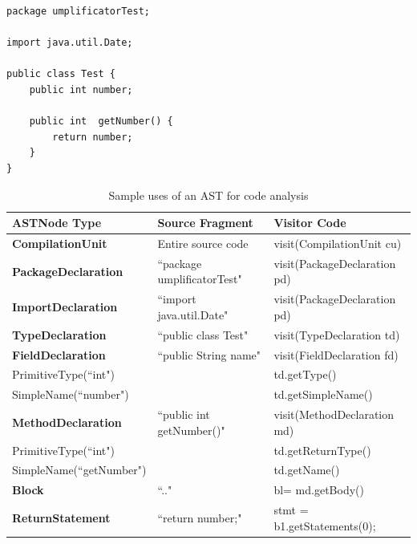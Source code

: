 \begin{lstlisting}[style=java, caption=Test.java, label=lst:astjava]
package umplificatorTest;

import java.util.Date;

public class Test {
	public int number;
	
	public int  getNumber() {
		return number;
	}
}
\end{lstlisting}

\newcommand*{\MyIndent}{\hspace*{0.4cm}}%
\begin{table}[h]
\caption{Sample uses of an AST for code analysis}
\label{table:astanalysis}
\begin{tabular}{l|p{4cm}p{4cm}}
\toprule
\rowcolor[HTML]{BBDAFF}
\textbf{ASTNode Type} & \textbf{Source Fragment}  & \textbf{Visitor Code}  \\ \midrule	
\textbf{CompilationUnit} &  Entire source code & visit(CompilationUnit cu) \\ \hline
\MyIndent \textbf{PackageDeclaration}& ``package umplificatorTest" & visit(PackageDeclaration pd) \\ \hline
\MyIndent \textbf{ImportDeclaration} & ``import java.util.Date" & visit(PackageDeclaration pd) \\ \hline
\MyIndent \textbf{TypeDeclaration} &  ``public class Test" & visit(TypeDeclaration td) \\ \hline
\MyIndent \MyIndent \textbf{FieldDeclaration} &  ``public String name" & visit(FieldDeclaration fd) \\ 
\MyIndent \MyIndent \MyIndent PrimitiveType(``int") &   &  td.getType() \\ 
\MyIndent \MyIndent \MyIndent SimpleName(``number") &   &  td.getSimpleName() \\ \hline
\MyIndent \MyIndent \textbf{MethodDeclaration} &  ``public int getNumber()" & visit(MethodDeclaration md) \\ 
\MyIndent \MyIndent \MyIndent PrimitiveType(``int") &   &  td.getReturnType() \\ 
\MyIndent \MyIndent \MyIndent SimpleName(``getNumber") &   &  td.getName() \\ \hline
\MyIndent \MyIndent \MyIndent \MyIndent \textbf{Block} & ``{..}"& bl=  md.getBody() \\ 
\MyIndent \MyIndent \MyIndent  \MyIndent \MyIndent \textbf{ReturnStatement} &  ``return number;" & stmt = b1.getStatements(0); \\ \bottomrule
\end{tabular}
\end{table}

